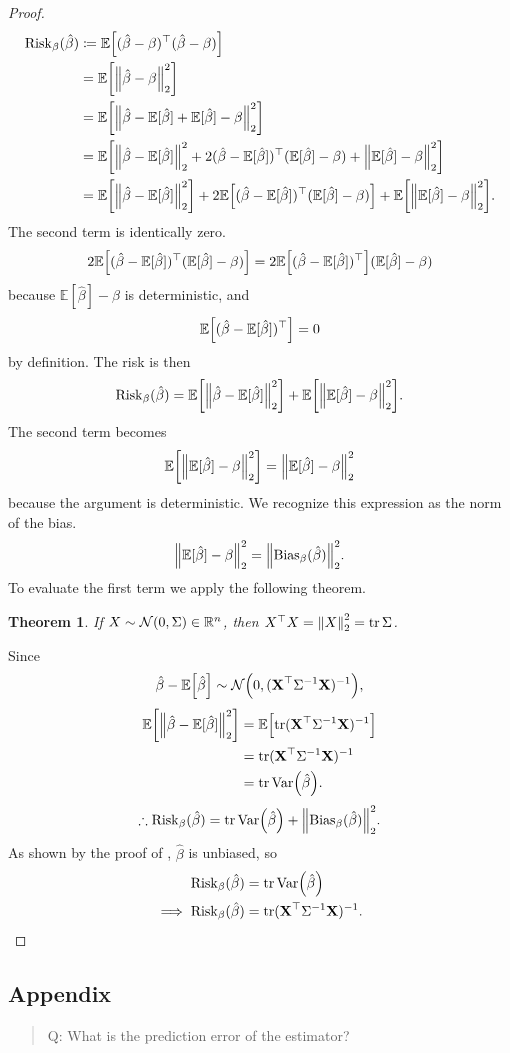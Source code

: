 \documentclass[letterpaper, reqno]{amsart}
\newtheorem{theorem}{Theorem}[section]
\numberwithin{equation}{section}
\DeclarePairedDelimiter{\norm}{\lVert}{\rVert}
\newcommand{\T}{\top} %
\newcommand{\vect}[1]{\boldsymbol{\mathbf{#1}}} %
\newcommand{\E}[1]{\mathbb{E}\mleft[#1\mright]}
\newcommand{\Var}[1]{\operatorname{Var}\mleft(#1\mright)}
\newcommand{\R}{\mathbb{R}}  %
\newcommand{\N}[2]{\mathcal{N}\mleft( #1, #2 \mright)}
\newcommand{\Xm}{\vect{X}}
\newcommand{\Bv}{\beta}
\newcommand{\Bvh}{\hat{\beta}}
\newcommand{\Ebh}{\mathbb{E}[\Bvh]}
\DeclareMathOperator{\tr}{tr}
\begin{document}
\begin{proof}
  \begin{alignat*}{3}
    \mathrm{Risk}_\Bv(\Bvh) &\coloneqq \E{(\Bvh - \Bv)^\T(\Bvh - \Bv)} \\
    &= \E{\norm*{\Bvh - \Bv}_2^2} \\
    &= \E{\norm*{\Bvh - \Ebh + \Ebh - \Bv}_2^2} \\
    &= \E{\norm*{\Bvh - \Ebh}_2^2 
      + 2(\Bvh - \Ebh)^\T (\Ebh - \Bv)
      + \norm*{\Ebh - \Bv}_2^2} \\
    &= \E{\norm*{\Bvh - \Ebh}_2^2}
      + 2\E{(\Bvh - \Ebh)^\T (\Ebh - \Bv)} 
      + \E{\norm*{\Ebh - \Bv}_2^2}.
  \end{alignat*}
  The second term is identically zero.
  \[ 2\E{(\Bvh - \Ebh)^\T (\Ebh - \Bv)} = 2\E{(\Bvh - \Ebh)^\T}(\Ebh - \Bv) \]
  because $\Ebh - \Bv$ is deterministic, and 
  \[ \E{(\Bvh - \Ebh)^\T} = 0 \]
  by definition. The risk is then
  \[ \mathrm{Risk}_\Bv(\Bvh) = \E{\norm*{\Bvh - \Ebh}_2^2} + \E{\norm*{\Ebh - \Bv}_2^2}. \]
  The second term becomes
  \[ \E{\norm*{\Ebh - \Bv}_2^2} = \norm*{\Ebh - \Bv}_2^2 \]
  because the argument is deterministic. We recognize this expression as the
  norm of the bias.
  \[ \norm*{\Ebh - \Bv}_2^2 = \norm*{\mathrm{Bias}_\Bv(\Bvh)}_2^2. \]
  To evaluate the first term we apply the following theorem.
  \begin{theorem} \label{thm:normnorm}
    If $X \sim \N{0}{\Sigma} \in \R^n$, then $X^\T X = \norm*{X}_2^2 = \tr \Sigma$.
  \end{theorem}
  Since 
  \[ \Bvh - \E{\Bvh} \sim \N{0}{(\Xm^\T \Sigma^{-1} \Xm)^{-1}}, \]
  \begin{align*}
    \E{\norm*{\Bvh - \Ebh}_2^2} &= \E{\tr (\Xm^\T \Sigma^{-1} \Xm)^{-1}} \\
    &= \tr (\Xm^\T \Sigma^{-1} \Xm)^{-1} \\
    &= \tr \Var{\Bvh}.
  \end{align*}
  \[ \therefore \mathrm{Risk}_\Bv(\Bvh) = \tr \Var{\Bvh} + \norm*{\mathrm{Bias}_\Bv(\Bvh)}_2^2. \]
  As shown by the proof of , $\Bvh$ is
  unbiased, so
  \begin{align*}
    \mathrm{Risk}_\Bv(\Bvh) &= \tr \Var{\Bvh}  \\
    \implies \mathrm{Risk}_\Bv(\Bvh) &= \tr (\Xm^\T \Sigma^{-1} \Xm)^{-1}.
    \qedhere
  \end{align*}
\end{proof}

\subsection*{Appendix}
\begin{quote}
  Q: What is the prediction error of the estimator?
\end{quote}
\end{document}
